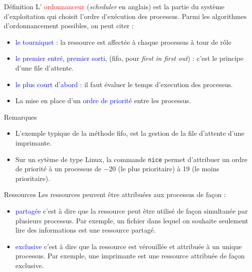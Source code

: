 \documentclass[10pt]{beamer}
\begin{document}
\begin{frame}	
	\mframe{\Processus}
	\begin{alertblock}{Définition}
		L' \textcolor{red}{ordonnanceur} (\textit{scheduler} en anglais) est la partie du système d'exploitation qui choisit l'ordre d'exécution des processus. Parmi les algorithmes d'ordonnancement possibles, on peut citer :
		\begin{itemize}
		\item<2-> \textcolor{blue}{le tourniquet} : la ressource est affectée à chaque processus à tour de rôle
		\item<3-> \textcolor{blue}{le premier entré, premier sorti}, ({\sc fifo}, pour \textit{first in first out}) : c'est le principe d'une file d'attente.
		\item<4-> \textcolor{blue}{le plus court d'abord} : il faut évaluer le temps d'execution des processus.
		\item<5-> La mise en place d'un \textcolor{blue}{ordre de priorité} entre les processus.
		\end{itemize}
	\end{alertblock}
	\begin{block}{Remarques}
	\begin{itemize}
	\item<6-> L'exemple typique de la méthode {\sc fifo}, est la gestion de la file d'attente d'une imprimante.
	\item<7-> Sur un sytème de type Linux, la commande {\tt nice} permet d'attribuer un ordre de priorité à un processus de $-20$ (le plus prioritaire) à 19 (le moins prioritaire). 
	\end{itemize}
	\end{block}
\end{frame}

\begin{frame}	
	\mframe{\Processus}
	\begin{block}{Ressources}
		Les ressources peuvent être attribuées aux processus de façon :
		\begin{itemize}
		\item<2-> \textcolor{blue}{partagée} c'est à dire que la ressource peut être utilisé de façon simultanée par plusieurs processus. 
		\onslide<3-> Par exemple, un fichier dans lequel on souhaite seulement lire des informations est une ressource partagé.
		\item<4-> \textcolor{blue}{exclusive} c'est à dire que la ressource est vérouillée et attribuée à un unique processus.
		\onslide<5-> Par exemple, une imprimante est une ressource attribuée de façon exclusive.
		\end{itemize}
	\end{block}
\end{frame}
\end{document}
